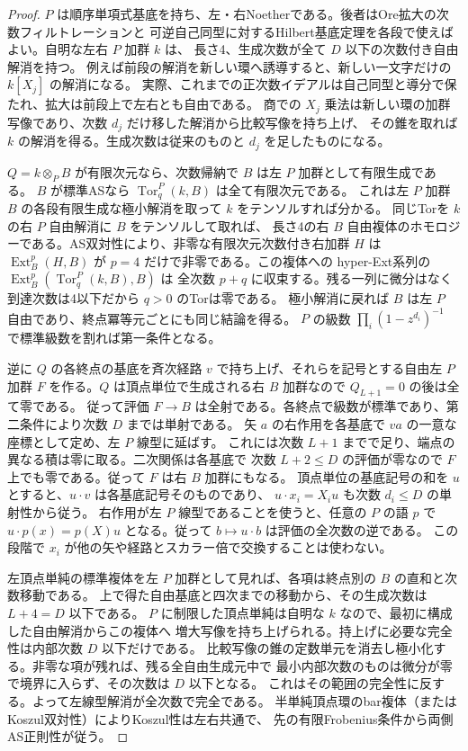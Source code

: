 \begin{proof}
$P$ は順序単項式基底を持ち、左・右Noetherである。後者はOre拡大の次数フィルトレーションと
可逆自己同型に対するHilbert基底定理を各段で使えばよい。自明な左右 $P$ 加群 $k$ は、
長さ4、生成次数が全て $D$ 以下の次数付き自由解消を持つ。
例えば前段の解消を新しい環へ誘導すると、新しい一文字だけの $k[X_j]$ の解消になる。
実際、これまでの正次数イデアルは自己同型と導分で保たれ、拡大は前段上で左右とも自由である。
商での $X_j$ 乗法は新しい環の加群写像であり、次数 $d_j$ だけ移した解消から比較写像を持ち上げ、
その錐を取れば $k$ の解消を得る。生成次数は従来のものと $d_j$ を足したものになる。

$Q=k\otimes_P B$ が有限次元なら、次数帰納で $B$ は左 $P$ 加群として有限生成である。
$B$ が標準ASなら $\operatorname{Tor}^P_q(k,B)$ は全て有限次元である。
これは左 $P$ 加群 $B$ の各段有限生成な極小解消を取って $k$ をテンソルすれば分かる。
同じTorを $k$ の右 $P$ 自由解消に $B$ をテンソルして取れば、
長さ4の右 $B$ 自由複体のホモロジーである。AS双対性により、非零な有限次元次数付き右加群 $H$ は
$\operatorname{Ext}^p_B(H,B)$ が $p=4$ だけで非零である。この複体への
hyper-Ext系列の $\operatorname{Ext}^p_B(\operatorname{Tor}^P_q(k,B),B)$ は
全次数 $p+q$ に収束する。残る一列に微分はなく到達次数は4以下だから $q>0$ のTorは零である。
極小解消に戻れば $B$ は左 $P$ 自由であり、終点冪等元ごとにも同じ結論を得る。
$P$ の級数 $\prod_i(1-z^{d_i})^{-1}$ で標準級数を割れば第一条件となる。

逆に $Q$ の各終点の基底を斉次経路 $v$ で持ち上げ、それらを記号とする自由左 $P$ 加群
$F$ を作る。$Q$ は頂点単位で生成される右 $B$ 加群なので $Q_{L+1}=0$ の後は全て零である。
従って評価 $F\to B$ は全射である。各終点で級数が標準であり、第二条件により次数 $D$ までは単射である。
矢 $a$ の右作用を各基底で $v a$ の一意な座標として定め、左 $P$ 線型に延ばす。
これには次数 $L+1$ までで足り、端点の異なる積は零に取る。二次関係は各基底で
次数 $L+2\le D$ の評価が零なので $F$ 上でも零である。従って $F$ は右 $B$ 加群にもなる。
頂点単位の基底記号の和を $u$ とすると、$u\cdot v$ は各基底記号そのものであり、
$u\cdot x_i=X_i u$ も次数 $d_i\le D$ の単射性から従う。
右作用が左 $P$ 線型であることを使うと、任意の $P$ の語 $p$ で
$u\cdot p(x)=p(X)u$ となる。従って $b\mapsto u\cdot b$ は評価の全次数の逆である。
この段階で $x_i$ が他の矢や経路とスカラー倍で交換することは使わない。

左頂点単純の標準複体を左 $P$ 加群として見れば、各項は終点別の $B$ の直和と次数移動である。
上で得た自由基底と四次までの移動から、その生成次数は $L+4=D$ 以下である。
$P$ に制限した頂点単純は自明な $k$ なので、最初に構成した自由解消からこの複体へ
増大写像を持ち上げられる。持上げに必要な完全性は内部次数 $D$ 以下だけである。
比較写像の錐の定数単元を消去し極小化する。非零な項が残れば、残る全自由生成元中で
最小内部次数のものは微分が零で境界に入らず、その次数は $D$ 以下となる。
これはその範囲の完全性に反する。よって左線型解消が全次数で完全である。
半単純頂点環のbar複体（またはKoszul双対性）によりKoszul性は左右共通で、
先の有限Frobenius条件から両側AS正則性が従う。
\end{proof}

